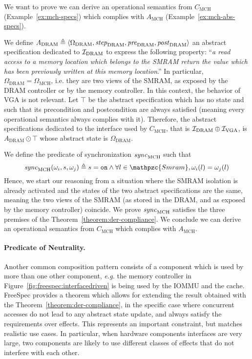 \begin{example}
  We want to prove we can derive an operational semantics from
  $C_{\mathrm{MCH}}$ (Example~\ref{ex:mch-specs}) which complies with
  $A_{\mathrm{MCH}}$ (Example~\ref{ex:mch-abs-specs}).

  We define
  $A_{\mathrm{DRAM}} \triangleq \langle \Omega_{\mathrm{DRAM}},
  \mathit{step}_{\mathrm{DRAM}}, \mathit{pre}_{\mathrm{DRAM}},
  \mathit{post}_{\mathrm{DRAM}} \rangle$ an abstract specification dedicated to
  $\mathcal{I}_{\mathrm{DRAM}}$ to express the following property: ``\emph{a read access
    to a memory location which belongs to the SMRAM return the value which has
    been previously written at this memory location}.'' In particular,
  $\Omega_{\mathrm{DRAM}} = \Omega_{\mathrm{MCH}}$, i.e. they are two views of
  the SMRAM, as exposed by the DRAM controller or by the memory controller.
  In this context, the behavior of VGA is not relevant. Let $\top$ be the
  abstract specification which has no state and such that its precondition and
  postcondition are always satisfied (meaning every operational semantics always
  complies with it).
  Therefore, the abstract specifications dedicated to the interface used by
  $C_{\mathrm{MCH}}$, that is $\mathcal{I}_{\mathrm{DRAM}} \oplus \mathcal{I}_{\mathrm{VGA}}$, is
  $A_{\mathrm{DRAM}} \odot \top$ whose abstract state is
  $\Omega_{\mathrm{DRAM}}$.

  We define the predicate of synchronization $\mathit{sync}_{\mathrm{MCH}}$ such
  that
  \[ \func{sync}_{\mathrm{MCH}}(\omega_i, s, \omega_j) \triangleq s = \val{on}
    \wedge \forall l \in \mathpzc{Smram}, \omega_i(l) = \omega_j(l)
  \]
  Hence, we start our reasoning from a situation where the SMRAM isolation is
  already activated and the states of the two abstract specifications are the
  same, meaning the two views of the SMRAM (as stored in the DRAM, and as
  exposed by the memory controller) coincide.
  We prove $\mathit{sync}_{\mathrm{MCH}}$ satisfies the three premises of the
  Theorem~\ref{theorem:der-compliance}. We conclude we can derive an operational
  semantics from $C_{\mathrm{MCH}}$ which complies with $A_{\mathrm{MCH}}$.
\end{example}

\paragraph{Predicate of Neutrality.}
%
Another common composition pattern consists of a component which is used by more
than one other component, \emph{e.g.} the memory controller in
Figure~\ref{fig:freespec:interfacedriven} is being used by the IOMMU and the
cache.
%
FreeSpec provides a theorem which allows for extending the result obtained with
the Theorem~\ref{theorem:der-compliance}, in the specific case where concurrent
accesses do not lead to any abstract state update, and always satisfy the
requirements over effects.
%
This represents an important constraint, but matches realistic use cases.
%
In particular, when hardware components interfaces are very large, two
components are likely to use different classes of effects that do not interfere
with each other.

